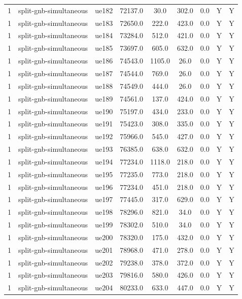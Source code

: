 \begin{table}[ht]
\begin{tabular}{|c|c|c|c|c|c|c|c|c|}
1 & split-gnb-simultaneous & ue182 & 72137.0 & 30.0 & 302.0 & 0.0 & Y & Y \\
1 & split-gnb-simultaneous & ue183 & 72650.0 & 222.0 & 423.0 & 0.0 & Y & Y \\
1 & split-gnb-simultaneous & ue184 & 73284.0 & 512.0 & 421.0 & 0.0 & Y & Y \\
1 & split-gnb-simultaneous & ue185 & 73697.0 & 605.0 & 632.0 & 0.0 & Y & Y \\
1 & split-gnb-simultaneous & ue186 & 74543.0 & 1105.0 & 26.0 & 0.0 & Y & Y \\
1 & split-gnb-simultaneous & ue187 & 74544.0 & 769.0 & 26.0 & 0.0 & Y & Y \\
1 & split-gnb-simultaneous & ue188 & 74549.0 & 444.0 & 26.0 & 0.0 & Y & Y \\
1 & split-gnb-simultaneous & ue189 & 74561.0 & 137.0 & 424.0 & 0.0 & Y & Y \\
1 & split-gnb-simultaneous & ue190 & 75197.0 & 434.0 & 233.0 & 0.0 & Y & Y \\
1 & split-gnb-simultaneous & ue191 & 75423.0 & 308.0 & 335.0 & 0.0 & Y & Y \\
1 & split-gnb-simultaneous & ue192 & 75966.0 & 545.0 & 427.0 & 0.0 & Y & Y \\
1 & split-gnb-simultaneous & ue193 & 76385.0 & 638.0 & 632.0 & 0.0 & Y & Y \\
1 & split-gnb-simultaneous & ue194 & 77234.0 & 1118.0 & 218.0 & 0.0 & Y & Y \\
1 & split-gnb-simultaneous & ue195 & 77235.0 & 773.0 & 218.0 & 0.0 & Y & Y \\
1 & split-gnb-simultaneous & ue196 & 77234.0 & 451.0 & 218.0 & 0.0 & Y & Y \\
1 & split-gnb-simultaneous & ue197 & 77445.0 & 317.0 & 629.0 & 0.0 & Y & Y \\
1 & split-gnb-simultaneous & ue198 & 78296.0 & 821.0 & 34.0 & 0.0 & Y & Y \\
1 & split-gnb-simultaneous & ue199 & 78302.0 & 510.0 & 34.0 & 0.0 & Y & Y \\
1 & split-gnb-simultaneous & ue200 & 78320.0 & 175.0 & 432.0 & 0.0 & Y & Y \\
1 & split-gnb-simultaneous & ue201 & 78968.0 & 471.0 & 278.0 & 0.0 & Y & Y \\
1 & split-gnb-simultaneous & ue202 & 79238.0 & 378.0 & 372.0 & 0.0 & Y & Y \\
1 & split-gnb-simultaneous & ue203 & 79816.0 & 580.0 & 426.0 & 0.0 & Y & Y \\
1 & split-gnb-simultaneous & ue204 & 80233.0 & 633.0 & 447.0 & 0.0 & Y & Y \\

\end{tabular}
\end{table}
